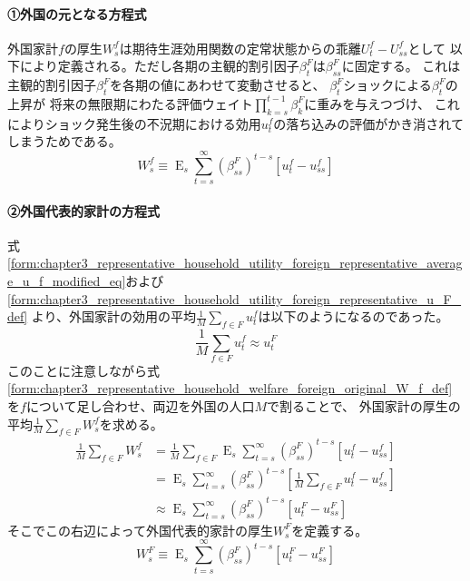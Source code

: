 \paragraph{①外国の元となる方程式}
\label{sec:chapter3_representative_household_welfare_foreign_original}
外国家計\(f\)の厚生\(W_s^f\)は期待生涯効用関数の定常状態からの乖離\(U_t^f-U_{ss}^f\)として
以下により定義される。ただし各期の主観的割引因子\(\beta_t^F\)は\(\beta_{ss}^F\)に固定する。
これは主観的割引因子\(\beta_t^F\)を各期の値にあわせて変動させると、
\(\beta_t^F\)ショックによる\(\beta_t^F\)の上昇が
将来の無限期にわたる評価ウェイト\(\prod_{k=s}^{t-1}\beta_k^F\)に重みを与えつづけ、
これによりショック発生後の不況期における効用\(u_t^f\)の落ち込みの評価がかき消されてしまうためである。
\begin{equation}
\label{form:chapter3_representative_household_welfare_foreign_original_W_f_def}
    W_s^f\equiv\operatorname{E}_s\sum_{t=s}^{\infty}(\beta_{ss}^F)^{t-s}\left[u_t^f-u_{ss}^f\right]
\end{equation}

\paragraph{②外国代表的家計の方程式}
\label{sec:chapter3_representative_household_welfare_foreign_representative}
式
\eqref{form:chapter3_representative_household_utility_foreign_representative_average_u_f_modified_eq}および
\eqref{form:chapter3_representative_household_utility_foreign_representative_u_F_def}
より、外国家計の効用の平均\(\frac{1}{M}\sum_{f\in F}u_t^f\)は以下のようになるのであった。
\begin{equation}
\label{form:chapter3_representative_household_welfare_foreign_representative_u_F_eq}
    \frac{1}{M}\sum_{f\in F}u_t^f\approx u_t^F
\end{equation}
このことに注意しながら式
\eqref{form:chapter3_representative_household_welfare_foreign_original_W_f_def}
を\(f\)について足し合わせ、両辺を外国の人口\(M\)で割ることで、
外国家計の厚生の平均\(\frac{1}{M}\sum_{f\in F}W_s^f\)を求める。
\begin{equation}
\label{form:chapter3_representative_household_welfare_foreign_representative_average_W_f_eq}
\begin{aligned}
    \frac{1}{M}\sum_{f\in F}W_s^f
    &=\frac{1}{M}\sum_{f\in F}\operatorname{E}_s\sum_{t=s}^{\infty}(\beta_{ss}^F)^{t-s}\left[u_t^f-u_{ss}^f\right] \\
    &=\operatorname{E}_s\sum_{t=s}^{\infty}(\beta_{ss}^F)^{t-s}\left[\frac{1}{M}\sum_{f\in F}u_t^f-u_{ss}^f\right] \\
    &\approx\operatorname{E}_s\sum_{t=s}^{\infty}(\beta_{ss}^F)^{t-s}\left[u_t^F-u_{ss}^F\right]
\end{aligned}
\end{equation}
そこでこの右辺によって外国代表的家計の厚生\(W_s^F\)を定義する。
\begin{equation}
\label{form:chapter3_representative_household_welfare_foreign_representative_W_F_def}
    W_s^F\equiv\operatorname{E}_s\sum_{t=s}^{\infty}(\beta_{ss}^F)^{t-s}\left[u_t^F-u_{ss}^F\right]
\end{equation}